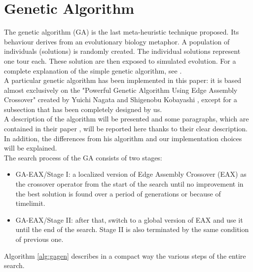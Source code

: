 \section{Genetic Algorithm}
The genetic algorithm (GA) is the last meta-heuristic technique proposed. Its behaviour derives from an evolutionary biology metaphor. A population of individuals (solutions) is randomly created. The individual solutions represent one tour each. These solution are then exposed to simulated evolution.
For a complete explanation of the simple genetic algorithm, see \cite{phdthesis}.\\
A particular genetic algorithm has been implemented in this paper: it is based almost exclusively on the "Powerful Genetic Algorithm Using Edge Assembly Crossover" created by Yuichi Nagata and Shigenobu Kobayashi \cite{Nagata2013, Honda2013}, except for a subsection that has been completely designed by us.\\ A description of the algorithm will be presented and some paragraphs, which are contained in their paper \cite{Nagata2013}, will be reported here thanks to their clear description. In addition, the differences from his algorithm and our implementation choices will be explained.\\
The search process of the GA consists of two stages: \\
\begin{itemize}
\item GA-EAX/Stage I: a localized version of Edge Assembly Crossover (EAX) as the crossover operator from the start of the search until no improvement in the best solution is found over a period of generations or because of timelimit.
\item  GA-EAX/Stage II: after that, switch to a global version of EAX and use it until the end of the search. Stage II is also terminated by the same condition of previous one.
\end{itemize}


Algorithm \ref{alg:gagen} describes in a compact way the various steps of the entire search.\\

